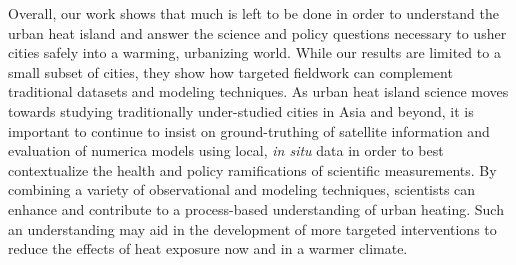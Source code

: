 Overall, our work shows that much is left to be done in order to understand the urban heat island and answer the science and policy questions necessary to usher cities safely into a warming, urbanizing world. 
While our results are limited to a small subset of cities, they show how targeted fieldwork can complement traditional datasets and modeling techniques.
As urban heat island science moves towards studying traditionally under-studied cities in Asia and beyond, it is important to continue to insist on ground-truthing of satellite information and evaluation of numerica models using local, \textit{in situ} data in order to best contextualize the health and policy ramifications of scientific measurements. By combining a variety of observational and modeling techniques, scientists can enhance and contribute to a process-based understanding of urban heating. 
Such an understanding may aid in the development of more targeted interventions to reduce the effects of heat exposure now and in a warmer climate.
